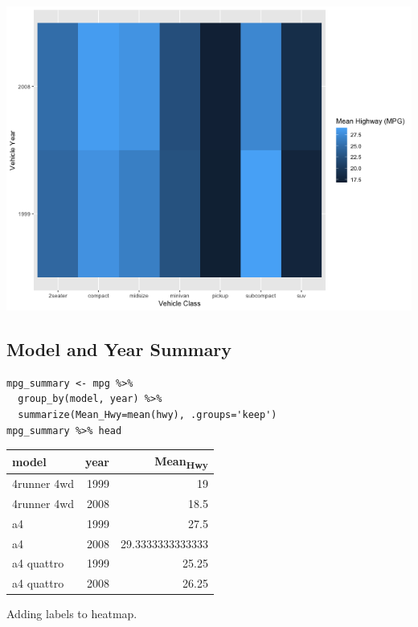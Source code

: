 \documentclass[11pt]{article}
\begin{document}
\begin{org}
\begin{center}
\includegraphics[width=.9\linewidth]{./resources/mpg_heatmap1.png}
\end{center}
\end{org}

\subsection{Model and Year Summary}
\label{sec:org6b768b5}

\begin{verbatim}
mpg_summary <- mpg %>%
  group_by(model, year) %>%
  summarize(Mean_Hwy=mean(hwy), .groups='keep')
mpg_summary %>% head
\end{verbatim}

\begin{org}
\begin{center}
\begin{tabular}{lrr}
model & year & Mean\textsubscript{Hwy}\\
\hline
4runner 4wd & 1999 & 19\\
4runner 4wd & 2008 & 18.5\\
a4 & 1999 & 27.5\\
a4 & 2008 & 29.3333333333333\\
a4 quattro & 1999 & 25.25\\
a4 quattro & 2008 & 26.25\\
\end{tabular}
\end{center}
\end{org}

Adding labels to heatmap.
\end{document}
